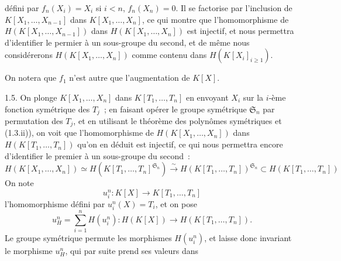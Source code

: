 
défini par \(f_n(X_i)=X_i\) si \(i<n\), \(f_n(X_n)=0\). Il se factorise par l'inclusion de \(K[X_1,\ldots,X_{n-1}]\) dans \(K[X_1,\ldots,X_n]\), ce qui montre que l'homomorphisme de \(H(K[X_1,\ldots,X_{n-1}])\) dans \(H(K[X_1,\ldots,X_n])\) est injectif, et nous permettra d'identifier le permier à un sous-groupe du second, et de même nous considérerons \(H(K[X_1,\ldots,X_n])\) comme contenu dans \(H(K[X_i]_{i\geq 1})\).

On notera que \(f_1\) n'est autre que l'augmentation de \(K[X]\).

1.5. On plonge \(K[X_1,\ldots,X_n]\) dans \(K[T_1,\ldots,T_n]\) en envoyant \(X_i\) sur la \(i\)-ème fonction symétrique des \(T_j\)~; en faisant opérer le groupe symétrique \(\mathfrak S_n\) par permutation des \(T_j\), et en utilisant le théorème des polynômes symétriques et (1.3.ii)), on voit que l'homomorphisme de \(H(K[X_1,\ldots,X_n])\) dans \(H(K[T_1,\ldots,T_n])\) qu'on en déduit est injectif, ce qui nous permettra encore d'identifier le premier à un sous-groupe du second~:
\[
  H(K[X_1,\ldots,X_n])\simeq H(K[T_1,\ldots,T_n]^{\mathfrak S_n})\xrightarrow{\sim} H(K[T_1,\ldots,T_n])^{\mathfrak S_n}\subset H(K[T_1,\ldots,T_n])
\]%
On note
\[
  u_i^n:K[X]\longrightarrow K[T_1,\ldots,T_n]
\]
l'homomorphisme défini par \(u_i^n(X)=T_i\), et on pose
\[
  u_H^n=\sum_{i=1}^n H(u_i^n):H(K[X])\longrightarrow H(K[T_1,\ldots,T_n]).
\]
Le groupe symétrique permute les morphismes \(H(u_i^n)\), et laisse donc invariant le morphisme \(u_H^n\), qui par suite prend ses valeurs dans

